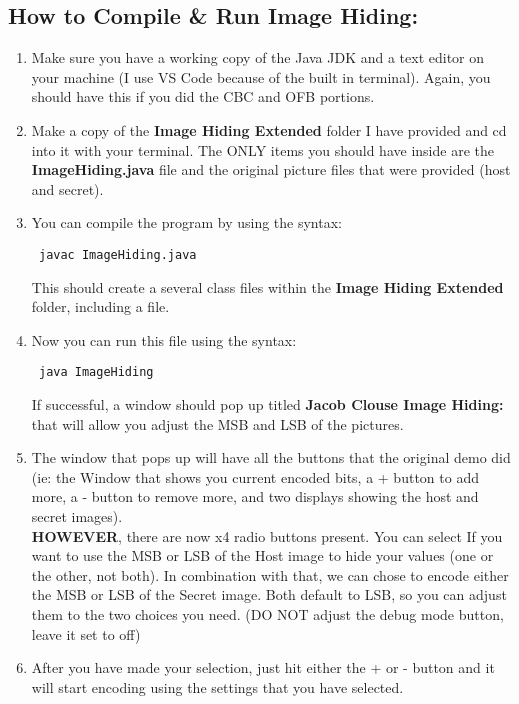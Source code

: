 \documentclass[10pt]{article}
\begin{document}
\subsection{How to Compile \& Run Image Hiding: } 
\begin{enumerate}
	\item Make sure you have a working copy of the Java JDK and a text editor on your machine (I use VS Code because of the built in terminal). Again, you should have this if you did the CBC and OFB portions.
	
	\item Make a copy of the \textbf{Image Hiding Extended} folder I have provided and cd into it with your terminal. The ONLY items you should have inside are the \textbf{ImageHiding.java} file and the original picture files that were provided (host and secret).
	
	\item You can compile the program by using the syntax: \begin{verbatim} javac ImageHiding.java \end{verbatim}
	This should create a several class files within the \textbf{Image Hiding Extended} folder, including a  file.
	
	\item Now you can run this file using the syntax: 
	\begin{verbatim} java ImageHiding \end{verbatim} 
	If successful, a window should pop up titled \textbf{Jacob Clouse Image Hiding:} that will allow you adjust the MSB and LSB of the pictures. 
	
	\item The window that pops up will have all the buttons that the original demo did (ie: the Window that shows you current encoded bits, a + button to add more, a - button to remove more, and two displays showing the host and secret images).\\ \textbf{HOWEVER}, there are now x4 radio buttons present. You can select If you want to use the MSB or LSB of the Host image to hide your values (one or the other, not both). In combination with that, we can chose to encode either the MSB or LSB of the Secret image. Both default to LSB, so you can adjust them to the two choices you need. (DO NOT adjust the debug mode button, leave it set to off)
	
	\item After you have made your selection, just hit either the + or - button and it will start encoding using the settings that you have selected.
\end{enumerate}
\vspace{0.2in}
\end{document}
